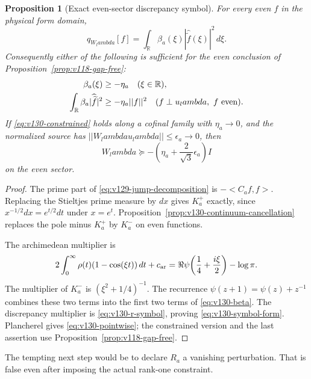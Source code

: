 \documentclass[11pt]{article}
\def\lambda{lambda}%
\def\norm#1{||#1||}%
\def\ip#1#2{<#1,#2>}%
\newtheorem{proposition}[theorem]{Proposition}
\theoremstyle{remark}
\newcommand{\norm}[1]{\left\lVert #1\right\rVert}
\newcommand{\ip}[2]{\left\langle #1,#2\right\rangle}
\begin{document}
\begin{proposition}[Exact even-sector discrepancy symbol]
\label{prop:v130-remainder}
For every even $f$ in the physical form domain,
\begin{equation}\label{eq:v130-symbol-form}
 q_{W_\lambda}[f]
   =\int_{\mathbb R}\beta_a(\xi)
          |\widehat{\widetilde f}(\xi)|^2\,d\xi .
\end{equation}
Consequently either of the following is sufficient for the even
conclusion of Proposition~\ref{prop:v118-gap-free}:
\begin{align}
 \beta_a(\xi)&\ge-\eta_a\quad(\xi\in\mathbb R),\label{eq:v130-pointwise}\\
 \int_{\mathbb R}\beta_a|\widehat{\widetilde f}|^2
   &\ge-\eta_a\norm f^2
   \quad(f\perp u_\lambda,\ f\ {\rm even}).\label{eq:v130-constrained}
\end{align}
If \eqref{eq:v130-constrained} holds along a cofinal family with
$\eta_a\to0$, and the normalized source has
$\norm{W_\lambda u_\lambda}\le\epsilon_a\to0$, then
\[
 W_\lambda\succeq-
 \left(\eta_a+\frac{2}{\sqrt3}\epsilon_a\right)I
\]
on the even sector.
\end{proposition}
\begin{proof}
The prime part of \eqref{eq:v129-jump-decomposition} is
$-\ip{C_af}f$. Replacing the Stieltjes prime measure by $dx$ gives
$K_a^+$ exactly, since $x^{-1/2}dx=e^{t/2}dt$ under $x=e^t$.
Proposition~\ref{prop:v130-continuum-cancellation} replaces the pole
minus $K_a^+$ by $K_a^-$ on even functions.

The archimedean multiplier is
\[
 2\int_0^\infty\rho(t)(1-\cos(\xi t))\,dt+c_{\rm ar}
 =\Re\psi\!\left(\frac14+\frac{i\xi}{2}\right)-\log\pi.
\]
The multiplier of $K_a^-$ is $(\xi^2+1/4)^{-1}$. The recurrence
$\psi(z+1)=\psi(z)+z^{-1}$ combines these two terms into the first
two terms of \eqref{eq:v130-beta}. The discrepancy multiplier is
\eqref{eq:v130-r-symbol}, proving \eqref{eq:v130-symbol-form}.
Plancherel gives \eqref{eq:v130-pointwise}; the constrained version
and the last assertion use Proposition~\ref{prop:v118-gap-free}.
\end{proof}

The tempting next step would be to declare $R_a$ a vanishing
perturbation. That is false even after imposing the actual rank-one
constraint.
\end{document}
